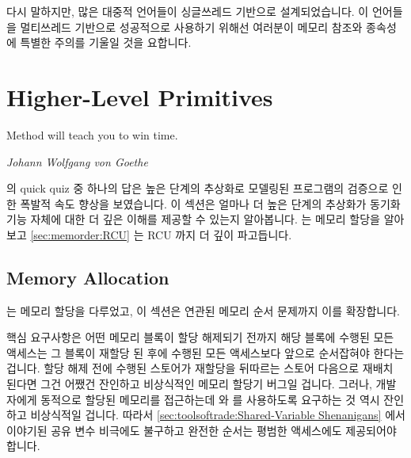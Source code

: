다시 말하지만, 많은 대중적 언어들이 싱글쓰레드 기반으로 설계되었습니다.
이 언어들을 멀티쓰레드 기반으로 성공적으로 사용하기 위해선 여러분이 메모리
참조와 종속성에 특별한 주의를 기울일 것을 요합니다.

\section{Higher-Level Primitives}
\label{sec:memorder:Higher-Level Primitives}
%
\epigraph{Method will teach you to win time.}
	 {\emph{Johann Wolfgang von Goethe}}

의 quick quiz 중 하나의 답은 높은 단계의 추상화로 모델링된 프로그램의 검증으로
인한 폭발적 속도 향상을 보였습니다.
이 섹션은 얼마나 더 높은 단계의 추상화가 동기화 기능 자체에 대한 더 깊은 이해를
제공할 수 있는지 알아봅니다.
는 메모리 할당을 알아보고
\cref{sec:memorder:RCU}
는 RCU 까지 더 깊이 파고듭니다.

\subsection{Memory Allocation}
\label{sec:memorder:Memory Allocation}

는 메모리 할당을 다루었고, 이 섹션은 연관된 메모리 순서 문제까지 이를
확장합니다.

핵심 요구사항은 어떤 메모리 블록이 할당 해제되기 전까지 해당 블록에 수행된 모든
액세스는 그 블록이 재할당 된 후에 수행된 모든 액세스보다 앞으로 순서잡혀야
한다는 겁니다.
할당 해제 전에 수행된 스토어가 재할당을 뒤따르는 스토어 다음으로 재배치 된다면
그건 어쨌건 잔인하고 비상식적인 메모리 할당기 버그일 겁니다.
그러나, 개발자에게 동적으로 할당된 메모리를 접근하는데  와
 를 사용하도록 요구하는 것 역시 잔인하고 비상식적일 겁니다.
따라서
\cref{sec:toolsoftrade:Shared-Variable Shenanigans}
에서 이야기된 공유 변수 비극에도 불구하고 완전한 순서는 평범한 액세스에도
제공되어야 합니다.

